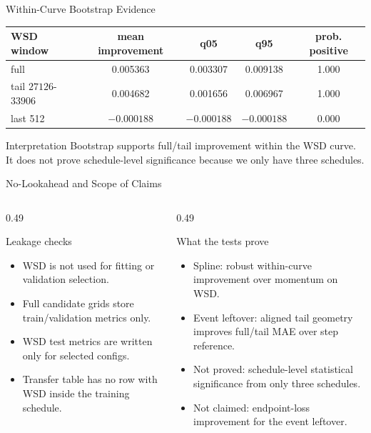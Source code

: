 \documentclass[fontset=fandol,aspectratio=169,10pt]{ctexbeamer}
\begin{document}
\begin{frame}{Within-Curve Bootstrap Evidence}
  \begin{table}
    \centering
    \scriptsize
    \begin{tabular}{lcccc}
      \toprule
      WSD window & mean improvement & q05 & q95 & prob. positive\\
      \midrule
      full & 0.005363 & 0.003307 & 0.009138 & 1.000\\
      tail \(27126\)-\(33906\) & 0.004682 & 0.001656 & 0.006967 & 1.000\\
      last 512 & \(-0.000188\) & \(-0.000188\) & \(-0.000188\) & 0.000\\
      \bottomrule
    \end{tabular}
  \end{table}
  \vspace{0.4em}
  \begin{block}{Interpretation}
    Bootstrap supports full/tail improvement within the WSD curve. It does not prove schedule-level significance because we only have three schedules.
  \end{block}
\end{frame}

\begin{frame}{No-Lookahead and Scope of Claims}
  \begin{columns}[T,onlytextwidth]
    \begin{column}{0.49\textwidth}
      \begin{block}{Leakage checks}
        \begin{itemize}
          \item WSD is not used for fitting or validation selection.
          \item Full candidate grids store train/validation metrics only.
          \item WSD test metrics are written only for selected configs.
          \item Transfer table has no row with WSD inside the training schedule.
        \end{itemize}
      \end{block}
    \end{column}
    \begin{column}{0.49\textwidth}
      \begin{block}{What the tests prove}
        \begin{itemize}
          \item Spline: robust within-curve improvement over momentum on WSD.
          \item Event leftover: aligned tail geometry improves full/tail MAE over step reference.
          \item Not proved: schedule-level statistical significance from only three schedules.
          \item Not claimed: endpoint-loss improvement for the event leftover.
        \end{itemize}
      \end{block}
    \end{column}
  \end{columns}
\end{frame}
\end{document}
